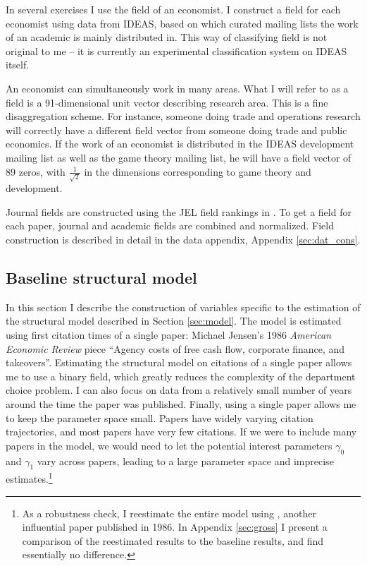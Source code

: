 In several exercises I use the field of an economist. I
construct a field for each economist using data from IDEAS, based on
which curated mailing lists the work of an academic is mainly distributed in. 
This way of classifying field is not original to me -- it is currently
an experimental classification system on IDEAS itself.

An economist can simultaneously work in many areas.  What I will refer to as a 
field is a 91-dimensional unit vector describing research area. This is a 
fine disaggregation scheme.  For instance, someone doing trade and operations research
will correctly have a different field vector from someone doing trade and public economics. 
If the work of an economist is distributed in the IDEAS development 
mailing list as well as the game theory mailing list, he will
have a field vector of 89 zeros, with $\frac{1}{\sqrt{2}}$ in the
dimensions corresponding to game theory and development. 

Journal fields are constructed using the JEL field rankings in \citet{barrett2000subdiscipline}.
To get a field for each paper, journal and academic fields are combined and normalized.
Field construction is described in detail in the data appendix, Appendix \ref{sec:dat_cons}.

\subsection{Baseline structural model}
\label{sec:struct_dat}

In this section I describe the construction of variables specific to the estimation
of the structural model described in Section \ref{sec:model}.  The model is
estimated using first citation
times of a single paper: Michael Jensen's 1986 \emph{American Economic
Review} piece ``Agency costs of free cash
flow, corporate finance, and takeovers''.
Estimating the structural model on
citations of a single paper allows me to use a binary field,
which greatly reduces the complexity of the department choice problem.
I can also focus on data from a relatively small number of years around the time the paper
was published.  Finally, using a single paper allows me to keep the parameter 
space small.  Papers have widely varying citation trajectories, and most
papers have very few citations.  If we were to include many papers in the model,
we would need to let the potential interest parameters  $\gamma_0$ and $\gamma_1$
vary across papers, leading to a large parameter space and imprecise estimates.\footnote{
    As a robustness check, I reestimate the entire model using \citet{grossman1986costs},
    another influential paper published in 1986.  In Appendix \ref{sec:gross} I present a comparison of the reestimated results
 to the baseline results, and find essentially no difference.}


